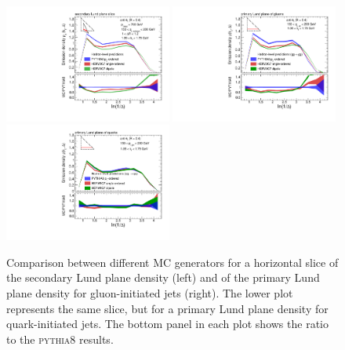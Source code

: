 \documentclass[a4paper,11pt]{article}
\newcommand{\py}{{\textsc{pythia}}8\xspace}
\begin{document}
\begin{figure}[h!]
    \centering
    \includegraphics[width = 0.49\textwidth]{Figure6a.pdf}
        \includegraphics[width = 0.49\textwidth]{Figure6b.pdf}
        \includegraphics[width = 0.49\textwidth]{quarksVsQuarks_primaryLJP.pdf}
    \caption{Comparison between different MC generators for a horizontal slice of the secondary Lund plane density (left) and of the primary Lund plane density for gluon-initiated jets (right). The lower plot represents the same slice, but for a primary Lund plane density for quark-initiated jets. The bottom panel in each plot shows the ratio to the \py results.}
    \label{fig:mc-comparison}
\end{figure}
\end{document}
